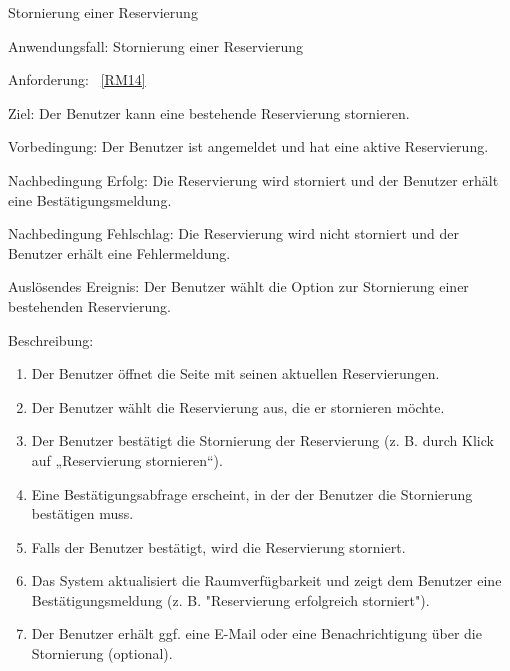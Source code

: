 \begin{function}{70}{Stornierung einer Reservierung}
    \item[Anwendungsfall:] Stornierung einer Reservierung
    \item[Anforderung:] ~\ref{RM14}
    \item[Ziel:] Der Benutzer kann eine bestehende Reservierung stornieren.
    \item[Vorbedingung:] Der Benutzer ist angemeldet und hat eine aktive Reservierung.
    \item[Nachbedingung Erfolg:] Die Reservierung wird storniert und der Benutzer erhält eine Bestätigungsmeldung.
    \item[Nachbedingung Fehlschlag:] Die Reservierung wird nicht storniert und der Benutzer erhält eine Fehlermeldung.
    \item[Auslösendes Ereignis:] Der Benutzer wählt die Option zur Stornierung einer bestehenden Reservierung.
    \item[Beschreibung:] ~
    \begin{enumerate}
        \item Der Benutzer öffnet die Seite mit seinen aktuellen Reservierungen.
        \item Der Benutzer wählt die Reservierung aus, die er stornieren möchte.
        \item Der Benutzer bestätigt die Stornierung der Reservierung (z. B. durch Klick auf „Reservierung stornieren“).
        \item Eine Bestätigungsabfrage erscheint, in der der Benutzer die Stornierung bestätigen muss.
        \item Falls der Benutzer bestätigt, wird die Reservierung storniert.
        \item Das System aktualisiert die Raumverfügbarkeit und zeigt dem Benutzer eine Bestätigungsmeldung (z. B. "Reservierung erfolgreich storniert").
        \item Der Benutzer erhält ggf. eine E-Mail oder eine Benachrichtigung über die Stornierung (optional).
    \end{enumerate}
\end{function}


